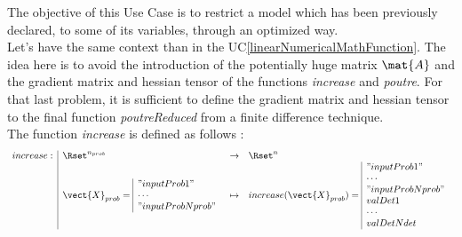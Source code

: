 \renewcommand{\filename}{docUC_LSF_DeterministicVar2.tex}
\renewcommand{\filetitle}{UC : Introducing some deterministic variables, optimizing memory and CPU time}

\HeaderIIILevel




The objective of this Use Case is to restrict a model which has been previously declared, to some of its variables, through an optimized way.\\

Let's have the same context than in the UC\ref{linearNumericalMathFunction}. The idea here is to avoid the introduction of the potentially huge matrix $\mat{A}$ and the gradient matrix and hessian tensor  of the functions \textit{increase} and \textit{poutre}. For that last problem, it is sufficient to define the gradient matrix and hessian tensor to the final function \textit{poutreReduced} from a finite difference technique.\\

The function {\itshape increase} is defined as follows :
\begin{align*}
  \begin{array}{l|lcl}
    increase : & \Rset^{n_{prob}}  & \rightarrow & \Rset^n \\
    &  \vect{X}_{prob} =
    \begin{array}{|l}
      "inputProb1" \\
      \cdots       \\
      "inputProbNprob"
    \end{array}
    & \mapsto     & increase(\vect{X}_{prob}) =
    \begin{array}{|l}
      "inputProb1" \\
      \cdots       \\
      "inputProbNprob" \\
      valDet1 \\
      \cdots       \\
      valDetNdet
    \end{array}
  \end{array}
\end{align*}

